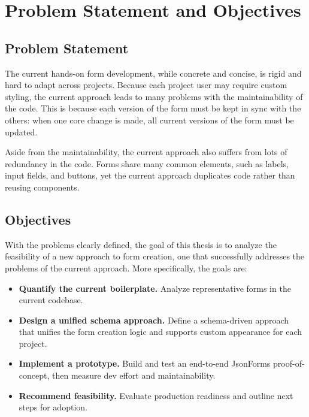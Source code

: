 \section{Problem Statement and Objectives}

\subsection{Problem Statement}
The current hands-on form development, while concrete and concise, is rigid and hard to adapt across projects.
Because each project user may require custom styling, the current approach leads to many problems with the maintainability
of the code.
This is because each version of the form must be kept in sync with the others: when one core change is made, all current
versions of the form must be updated.

Aside from the maintainability, the current approach also suffers from lots of redundancy in the code.
Forms share many common elements, such as labels, input fields, and buttons, yet the current approach duplicates code
rather than reusing components.

\subsection{Objectives}

With the problems clearly defined, the goal of this thesis is to analyze the feasibility of a new approach to form
creation, one that successfully addresses the problems of the current approach.
More specifically, the goals are:

\begin{itemize}
\item \textbf{Quantify the current boilerplate.} Analyze representative forms in the current codebase.
\item \textbf{Design a unified schema approach.} Define a schema-driven approach that unifies the form creation logic and
    supports custom appearance for each project.
\item \textbf{Implement a prototype.} Build and test an end-to-end JsonForms proof-of-concept, then measure dev effort and maintainability.
\item \textbf{Recommend feasibility.} Evaluate production readiness and outline next steps for adoption.
\end{itemize}